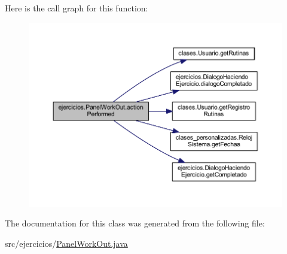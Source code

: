 Here is the call graph for this function\+:
\nopagebreak
\begin{figure}[H]
\begin{center}
\leavevmode
\includegraphics[width=350pt]{classejercicios_1_1_panel_work_out_a19b4f5f27b47a42f353acbb75d4b877e_cgraph}
\end{center}
\end{figure}


The documentation for this class was generated from the following file\+:\begin{DoxyCompactItemize}
\item 
src/ejercicios/\mbox{\hyperlink{_panel_work_out_8java}{Panel\+Work\+Out.\+java}}\end{DoxyCompactItemize}
